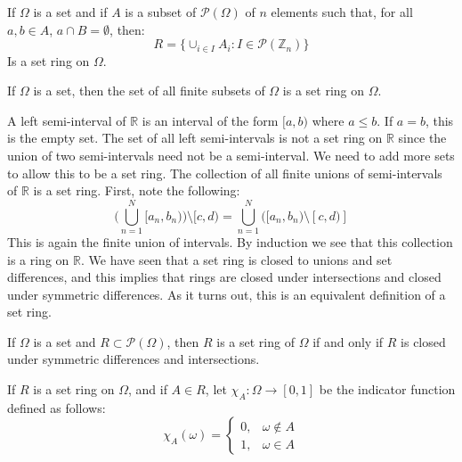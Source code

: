         \begin{theorem}
            If $\Omega$ is a set and if
            $A$ is a subset of $\mathcal{P}(\Omega)$ of
            $n$ elements such that, for all
            $a,b\in{A}$, $a\cap{B}=\emptyset$, then:
            \begin{equation}
                R=\{\cup_{i\in{I}}A_{i}:
                I\in\mathcal{P}(\mathbb{Z}_{n})\}
            \end{equation}
            Is a set ring on $\Omega$.
        \end{theorem}
        \begin{theorem}
            If $\Omega$ is a set, then the set of all
            finite subsets of $\Omega$ is a set ring on
            $\Omega$.
        \end{theorem}
        A left semi-interval of $\mathbb{R}$ is an interval
        of the form $[a,b)$ where $a\leq{b}$. If $a=b$, this
        is the empty set. The set of all left semi-intervals
        is not a set ring on $\mathbb{R}$ since the union
        of two semi-intervals need not be a semi-interval.
        We need to add more sets to allow this to be a
        set ring. The collection of all finite unions of
        semi-intervals of $\mathbb{R}$ is a set ring.
        First, note the following:
        \begin{equation}
            \Big(\bigcup_{n=1}^{N}[a_{n},b_{n})\Big)
            \setminus[c,d)=\bigcup_{n=1}^{N}
            \Big([a_{n},b_{n})\setminus[c,d)]
        \end{equation}
        This is again the finite union of intervals. By
        induction we see that this collection is a ring on
        $\mathbb{R}$. We have seen that a set ring is
        closed to unions and set differences, and this
        implies that rings are closed under intersections and
        closed under symmetric differences. As it turns out,
        this is an equivalent definition of a set ring.
        \begin{theorem}
            If $\Omega$ is a set and
            $R\subset\mathcal{P}(\Omega)$, then $R$ is
            a set ring of $\Omega$ if and only if $R$ is
            closed under symmetric differences and
            intersections.
        \end{theorem}
        If $R$ is a set ring on $\Omega$, and if
        $A\in{R}$, let $\chi_{A}:\Omega\rightarrow[0,1]$ be
        the indicator function defined as follows:
        \begin{equation}
            \chi_{A}(\omega)=
            \begin{cases}
                0,&\omega\notin{A}\\
                1,&\omega\in{A}
            \end{cases}
        \end{equation}
